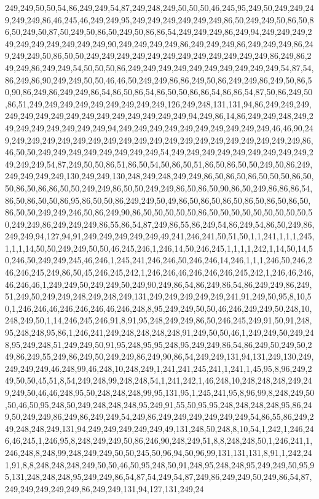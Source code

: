 249,249,50,50,54,86,249,249,54,87,249,248,249,50,50,50,46,245,95,249,50,249,249,249,249,249,86,46,245,46,249,249,95,249,249,249,249,249,249,86,50,249,249,50,86,50,86,50,249,50,87,50,249,50,86,50,249,50,86,86,54,249,249,249,86,249,94,249,249,249,249,249,249,249,249,249,249,90,249,249,249,249,86,249,249,249,86,249,249,249,86,249,249,249,50,86,50,50,249,249,249,249,249,249,249,249,249,249,249,249,86,249,86,249,249,86,249,249,54,50,50,50,86,249,249,249,249,249,249,249,249,249,249,54,87,54,86,249,86,90,249,249,50,50,46,46,50,249,249,86,86,249,50,86,249,249,86,249,50,86,50,90,86,249,86,249,249,86,54,86,50,86,54,86,50,50,86,86,54,86,86,54,87,50,86,249,50,86,51,249,249,249,249,249,249,249,249,249,126,249,248,131,131,94,86,249,249,249,249,249,249,249,249,249,249,249,249,249,249,249,94,249,86,14,86,249,249,248,249,249,249,249,249,249,249,249,94,249,249,249,249,249,249,249,249,249,249,46,46,90,249,249,249,249,249,249,249,249,249,249,249,249,249,249,249,249,249,249,249,249,86,46,50,50,249,249,249,249,249,249,249,249,54,249,249,249,249,249,249,249,249,249,249,249,249,54,87,249,50,50,86,51,86,50,54,50,86,50,51,86,50,86,50,50,249,50,86,249,249,249,249,249,130,249,249,130,248,249,248,249,249,86,50,86,50,86,50,50,50,86,50,50,86,50,86,86,50,50,249,249,86,50,50,249,249,86,50,86,50,90,86,50,249,86,86,86,54,86,50,86,50,50,86,95,86,50,50,86,249,249,50,49,86,50,86,50,86,50,86,50,86,50,86,50,86,50,50,249,249,246,50,86,249,90,86,50,50,50,50,50,86,50,50,50,50,50,50,50,50,50,50,249,249,86,249,249,249,86,55,86,54,87,249,86,55,86,249,54,86,249,54,86,50,249,86,249,249,94,127,94,91,249,249,249,249,249,49,241,246,241,50,51,50,1,1,241,1,1,1,245,1,1,1,14,50,50,249,249,50,50,46,245,246,1,246,14,50,246,245,1,1,1,1,242,1,14,50,14,50,246,50,249,249,245,46,246,1,245,241,246,246,50,246,246,14,246,1,1,1,246,50,246,246,246,245,249,86,50,45,246,245,242,1,246,246,46,246,246,246,245,242,1,246,46,246,46,246,46,1,249,249,50,249,249,50,249,90,249,86,54,86,249,86,54,86,249,249,86,249,51,249,50,249,249,248,249,248,249,131,249,249,249,249,249,241,91,249,50,95,8,10,50,1,246,246,46,246,246,246,46,246,248,8,95,249,249,50,50,46,246,249,249,50,248,10,248,249,50,1,14,246,245,246,91,8,91,95,248,249,249,86,50,246,245,249,91,50,91,248,95,248,248,95,86,1,246,241,249,248,248,248,248,91,249,50,50,46,1,249,249,50,249,248,95,249,248,51,249,249,50,91,95,248,95,95,248,95,249,249,86,54,86,249,50,249,50,249,86,249,55,249,86,249,50,249,249,86,249,90,86,54,249,249,131,94,131,249,130,249,249,249,249,46,248,99,46,248,10,248,249,1,241,241,245,241,1,241,1,45,95,8,96,249,249,50,50,45,51,8,54,249,248,99,248,248,54,1,241,242,1,46,248,10,248,248,248,249,249,249,50,46,46,248,95,50,248,248,248,99,95,131,95,1,245,241,95,8,96,99,8,248,249,50,50,46,50,95,248,50,249,248,248,248,95,249,91,55,50,95,95,248,248,248,248,95,86,249,50,249,249,86,249,86,249,249,54,249,86,249,249,249,249,249,249,54,86,55,86,249,249,248,248,249,131,94,249,249,249,249,249,49,131,248,50,248,8,10,54,1,242,1,246,246,46,245,1,246,95,8,248,249,249,50,86,246,90,248,249,51,8,8,248,248,50,1,246,241,1,246,248,8,248,99,248,249,249,50,50,245,50,96,94,50,96,99,131,131,131,8,91,1,242,241,91,8,8,248,248,248,249,50,50,46,50,95,248,50,91,248,95,248,248,95,249,249,50,95,95,131,248,248,248,95,249,249,86,54,87,54,249,54,87,249,86,249,249,50,249,86,54,87,249,249,249,249,249,86,249,249,131,94,127,131,249,24